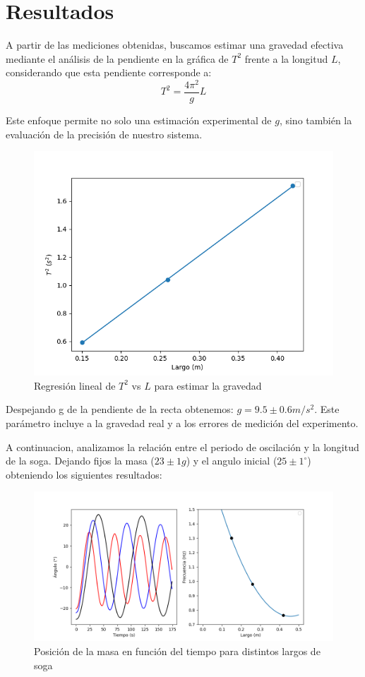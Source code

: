 \documentclass[12pt,a4]{article}
\begin{document}
\newpage

\section{Resultados}

A partir de las mediciones obtenidas, buscamos estimar una gravedad efectiva mediante el análisis de la pendiente en la gráfica de \( T^2 \) frente a la longitud \( L \), considerando que esta pendiente corresponde a:
\begin{equation}
    T^2 = \frac{4 \pi^2}{g} L
    \label{eq:gravedad}
\end{equation}

Este enfoque permite no solo una estimación experimental de \( g \), sino también la evaluación de la precisión de nuestro sistema.

\begin{figure}[H]
    \centering
    \includegraphics[width=0.6\linewidth]{gravedad.png}
    \caption{Regresión lineal de \( T^2 \) vs \( L \) para estimar la gravedad}   
    \label{fig:gravedad}
\end{figure}

Despejando g de la pendiente de la recta obtenemos: $g = 9.5 \pm 0.6 m/s^2$. Este parámetro incluye a la gravedad real y a los errores de medición del experimento.

A continuacion, analizamos la relación entre el periodo de oscilación y la longitud de la soga. Dejando fijos la masa ($23 \pm 1 g$) y el angulo inicial ($25 \pm 1 ^\circ$) obteniendo los siguientes resultados:

\begin{figure}[H]
    \centering
    \includegraphics[width=0.6\linewidth]{largo.png}
    \caption{Posición de la masa en función del tiempo para distintos largos de soga}
    \label{fig:largo}
\end{figure}
\end{document}
